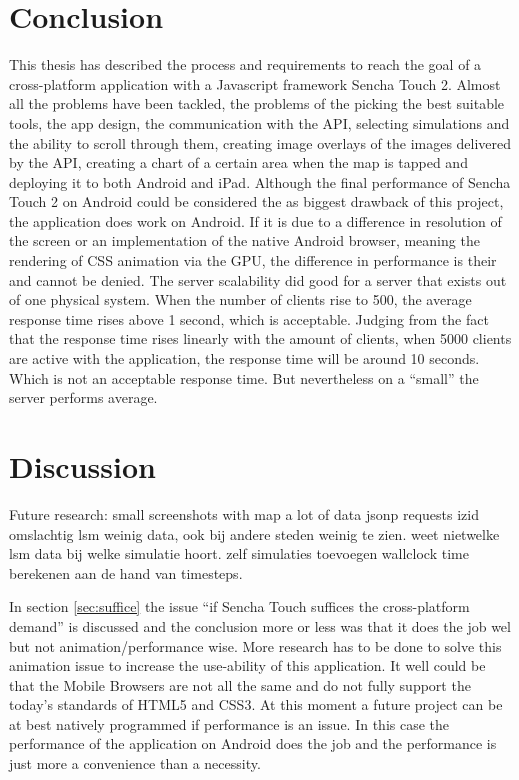 \section{Conclusion}
This thesis has described the process and requirements to reach the goal of a cross-platform application with a Javascript framework Sencha Touch 2. Almost all the problems have been tackled, the problems of the picking the best suitable tools, the app design, the communication with the API, selecting simulations and the ability to scroll through them, creating image overlays of the images delivered by the API, creating a chart of a certain area when the map is tapped and deploying it to both Android and iPad. 
Although the final performance of Sencha Touch 2 on Android could be considered the as biggest drawback of this project, the application does work on Android. If it is due to a difference in resolution of the screen or an implementation of the native Android browser, meaning the rendering of CSS animation via the GPU, the difference in performance is their and cannot be denied. 
The server scalability did good for a server that exists out of one physical system. When the number of clients rise to 500, the average response time rises above 1 second, which is acceptable. Judging from the fact that the response time rises linearly with the amount of clients, when 5000 clients are active with the application, the response time will be around 10 seconds. Which is not an acceptable response time. But nevertheless on a ``small'' the server performs average.

\section{Discussion}
Future research:
small screenshots with map
a lot of data
jsonp
requests izid omslachtig
lsm weinig data, ook bij andere steden weinig te zien.
weet nietwelke lsm data bij welke simulatie hoort.
zelf simulaties toevoegen
wallclock time berekenen aan de hand van timesteps.

In section \ref{sec:suffice} the issue ``if Sencha Touch suffices the cross-platform demand'' is discussed and the conclusion more or less was that it does the job wel but not animation/performance wise. More research has to be done to solve this animation issue to increase the use-ability of this application. It well could be that the Mobile Browsers are not all the same and do not fully support the today's standards of HTML5 and CSS3. At this moment a future project can be at best natively programmed if performance is an issue. In this case the performance of the application on Android does the job and the performance is just more a convenience than a necessity. 

